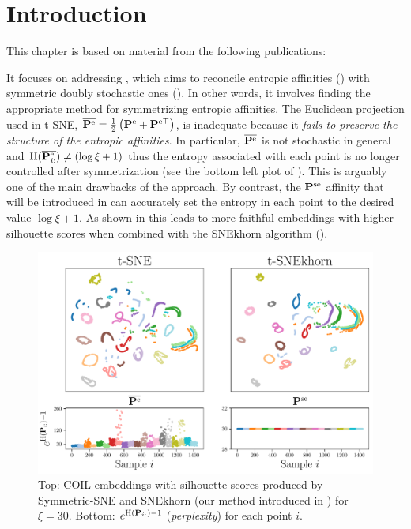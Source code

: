 
\section{Introduction}

This chapter is based on material from the following publications:

\begin{mdframed}
\begin{center} 
\end{center}
\end{mdframed}

\begin{mdframed}
    \begin{center} 
    \end{center}
\end{mdframed}

It focuses on addressing , which aims to reconcile entropic affinities () with symmetric doubly stochastic ones (). In other words, it involves finding the appropriate method for symmetrizing entropic affinities.
The Euclidean projection used in t-SNE, $\overline{\mathbf{P}^{\mathrm{e}}} = \frac{1}{2} \left( \mathbf{P}^{\mathrm{e}} + \mathbf{P}^{\mathrm{e} \top} \right)$, is inadequate because it \emph{fails to preserve the structure of the entropic affinities}.
In particular, $\overline{\mathbf{P}^{\mathrm{e}}}$ is not stochastic in
general and $\operatorname{H}(\overline{\mathbf{P}_{i:}^{\mathrm{e}}}) \neq (\log{\xi} + 1)$ thus the entropy associated with each point is no longer controlled after symmetrization (see the bottom left plot of ). This is
arguably one of the main drawbacks of the approach. By contrast, the
$\mathbf{P}^{\mathrm{se}}$ affinity that will be introduced in  can
accurately set the entropy in each point to the desired value $\log \xi + 1$.  As shown in  this leads to more faithful embeddings with higher silhouette scores when combined with the SNEkhorn algorithm ().

\begin{figure}
    \centering
    \includegraphics[width=0.6\linewidth]{figures/SNEkhorn/fig_coil.pdf}
    \caption{Top: COIL \cite{nene1996columbia} embeddings with silhouette scores produced by Symmetric-SNE and SNEkhorn (our method introduced in  ) for $\xi=30$. Bottom: $e^{\operatorname{H}(\mathbf{P}_{i:})-1}$ (\emph{perplexity}) for each point $i$.}
    \label{fig:coil}
\end{figure}

